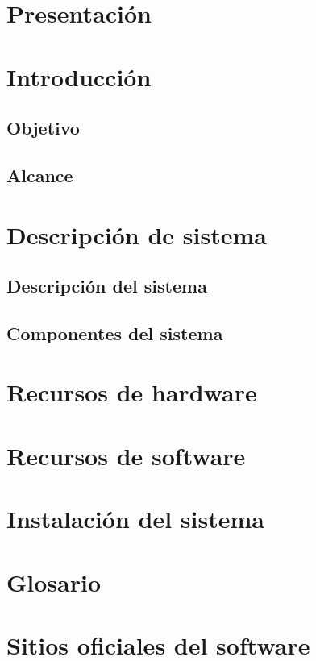 \section{Presentación}

\section{Introducción}
\subsection{Objetivo}

\subsection{Alcance}

\section{Descripción de sistema}
\subsection{Descripción del sistema}

\subsection{Componentes del sistema}

\section{Recursos de hardware}


\section{Recursos de software}

\clearpage
\section{Instalación del sistema}

\clearpage
\section{Glosario}

\clearpage
\section{Sitios oficiales del software}

\clearpage